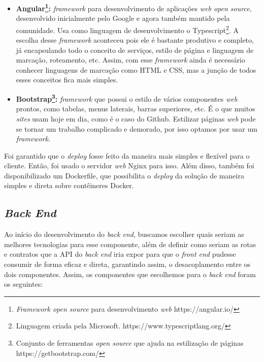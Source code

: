 \documentclass[11pt,twoside]{article}
\begin{document}
\begin{itemize}
  \item \textbf{Angular\footnote{\emph{Framework open source} para desenvolvimento \emph{web} https://angular.io/}:} \emph{framework} para desenvolvimento de aplicações \emph{web open source}, desenvolvido inicialmente pelo Google e agora também mantido pela comunidade. Usa como linguagem de desenvolvimento o
  Typescript\footnote{Linguagem criada pela Microsoft. https://www.typescriptlang.org/}. A escolha desse \emph{framework} aconteceu pois ele é bastante produtivo e completo, já encapsulando todo o conceito de serviços, estilo de página e 
  linguagem de marcação, roteamento, etc. Assim, com esse \emph{framework} ainda é necessário conhecer linguagens de marcação como HTML e CSS, mas a junção de todos esses conceitos fica mais simples.
  \item \textbf{Bootstrap\footnote{Conjunto de ferramentas \emph{open source} que ajuda na estilização de páginas https://getbootstrap.com/}:} \emph{framework} que possui o estilo de vários componentes \emph{web} prontos, como tabelas, menus laterais, barras superiores, etc. É o que muitos \emph{sites} usam hoje em dia, como é o caso do Github.
  Estilizar páginas \emph{web} pode se tornar um trabalho complicado e demorado, por isso optamos por usar um \emph{framework}.
\end{itemize}

Foi garantido que o \emph{deploy} fosse feito da maneira mais simples e flexível para o cliente. Então, foi usado o servidor \emph{web} Nginx para isso. Além disso, também foi disponibilizado um Dockerfile, que possibilita
o \emph{deploy} da solução de maneira simples e direta sobre contêineres Docker.

\subsection{\emph{Back End}}

Ao início do desenvolvimento do \emph{back end}, buscamos escolher quais seriam as melhores tecnologias para esse componente, além de definir como seriam as rotas e contratos que a API do \emph{back end} iria expor
para que o \emph{front end} pudesse consumir de forma eficaz e direta, garantindo assim, o desacoplamento entre os dois componentes. Assim, os componentes que escolhemos para o \emph{back end} foram os seguintes:
\end{document}
